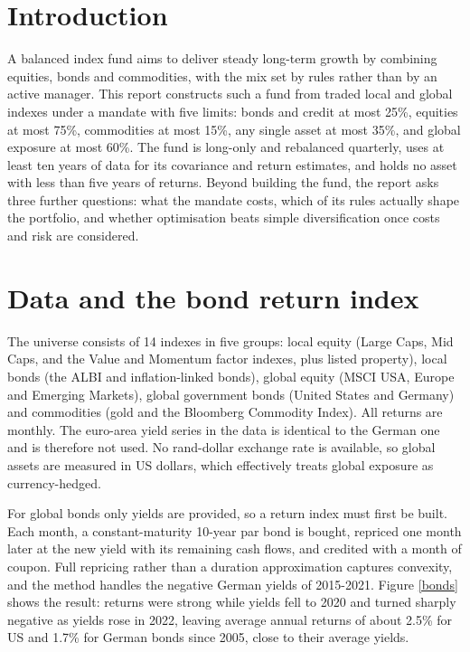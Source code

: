 \documentclass[11pt,preprint]{elsarticle}
\numberwithin{equation}{section}
\numberwithin{figure}{section}
\numberwithin{table}{section}
\begin{document}

\headsep 35pt %




\section{\texorpdfstring{Introduction
\label{Introduction}}{Introduction }}\label{introduction}

A balanced index fund aims to deliver steady long-term growth by
combining equities, bonds and commodities, with the mix set by rules
rather than by an active manager. This report constructs such a fund
from traded local and global indexes under a mandate with five limits:
bonds and credit at most 25\%, equities at most 75\%, commodities at
most 15\%, any single asset at most 35\%, and global exposure at most
60\%. The fund is long-only and rebalanced quarterly, uses at least ten
years of data for its covariance and return estimates, and holds no
asset with less than five years of returns. Beyond building the fund,
the report asks three further questions: what the mandate costs, which
of its rules actually shape the portfolio, and whether optimisation
beats simple diversification once costs and risk are considered.

\section{Data and the bond return
index}\label{data-and-the-bond-return-index}

The universe consists of 14 indexes in five groups: local equity (Large
Caps, Mid Caps, and the Value and Momentum factor indexes, plus listed
property), local bonds (the ALBI and inflation-linked bonds), global
equity (MSCI USA, Europe and Emerging Markets), global government bonds
(United States and Germany) and commodities (gold and the Bloomberg
Commodity Index). All returns are monthly. The euro-area yield series in
the data is identical to the German one and is therefore not used. No
rand-dollar exchange rate is available, so global assets are measured in
US dollars, which effectively treats global exposure as currency-hedged.

For global bonds only yields are provided, so a return index must first
be built. Each month, a constant-maturity 10-year par bond is bought,
repriced one month later at the new yield with its remaining cash flows,
and credited with a month of coupon. Full repricing rather than a
duration approximation captures convexity, and the method handles the
negative German yields of 2015-2021. Figure \ref{bonds} shows the
result: returns were strong while yields fell to 2020 and turned sharply
negative as yields rose in 2022, leaving average annual returns of about
2.5\% for US and 1.7\% for German bonds since 2005, close to their
average yields.
\end{document}
